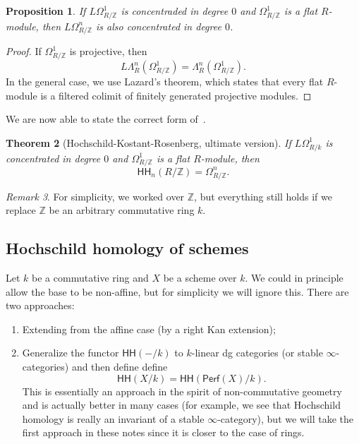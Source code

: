 \documentclass[10pt, oneside]{memoir}
\newtheorem{thm}{Theorem}[subsection]
\newtheorem{prop}[thm]{Proposition}
\theoremstyle{definition}
\theoremstyle{remark}
\newtheorem{rmk}[thm]{Remark}
\theoremstyle{plain}
\theoremstyle{definition}
\theoremstyle{remark}
\newcommand{\Z}{\mathbb{Z}}
\newcommand{\ms}[1]{\mathsf{#1}}
\newcommand{\1}{\mathbf{1}}
\newcommand{\2}{\mathbf{2}}
\newcommand{\3}{\mathbf{3}}
\newcommand{\HH}{\ms{HH}}
\begin{document}
\begin{prop}
    If \(L\Omega^1_{R/\Z} \) is concentraded in degree \(0 \) and \(\Omega^1_{R/\Z} \) is a flat \(R \)-module, then \(L\Omega^n_{R/\Z} \) is also concentrated in degree \(0 \).
\end{prop}

\begin{proof}
    If \(\Omega^1_{R/\Z} \) is projective, then
    \[ L \Lambda_R^n (\Omega^1_{R/\Z}) = \Lambda^n_R (\Omega^1_{R/\Z}). \]
    In the general case, we use Lazard's theorem, which states that every flat \(R \)-module is a filtered colimit of finitely generated projective modules.
\end{proof}

We are now able to state the correct form of~.
\begin{thm}[Hochschild-Kostant-Rosenberg, ultimate version]\label{thm:hkr2}
    If \(L\Omega^1_{R/k} \) is concentrated in degree \(0 \) and \(\Omega^1_{R/\Z} \) is a flat \(R \)-module, then
    \[ \HH_n(R/\Z) = \Omega^n_{R/\Z}. \]
\end{thm}

\begin{rmk}
    For simplicity, we worked over \(\Z \), but everything still holds if we replace \(\Z \) be an arbitrary commutative ring \(k \).
\end{rmk}

\subsection{Hochschild homology of schemes}%
\label{sub:Hochschild homology of schemes}

Let \(k \) be a commutative ring and \(X \) be a scheme over \(k \). We could in principle allow the base to be non-affine, but for simplicity we will ignore this. There are two approaches:
\begin{enumerate}
    \item Extending from the affine case (by a right Kan extension);
    \item Generalize the functor \(\HH(-/k) \) to \(k \)-linear dg categories (or stable \(\infty \)-categories) and then define define
    \[ \HH(X/k) = \HH(\ms{Perf}(X)/k). \]
    This is essentially an approach in the spirit of non-commutative geometry and is actually better in many cases (for example, we see that Hochschild homology is really an invariant of a stable \(\infty \)-category), but we will take the first approach in these notes since it is closer to the case of rings.
\end{enumerate}
\end{document}
